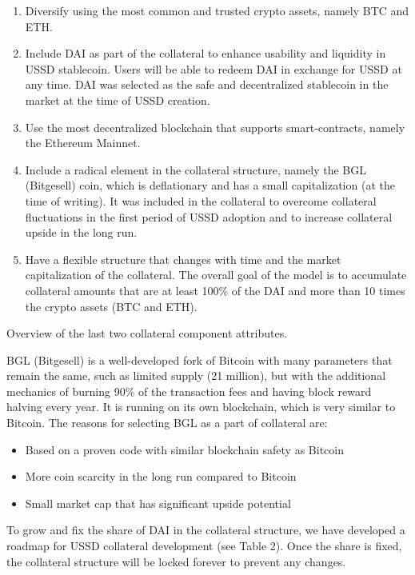 \begin{enumerate}
  \item Diversify using the most common and trusted crypto assets, namely BTC and ETH.
  \item Include DAI as part of the collateral to enhance usability and liquidity in USSD stablecoin. 
  Users will be able to redeem DAI in exchange for USSD at any time. DAI was selected as the safe 
  and decentralized stablecoin in the market at the time of USSD creation.
  \item Use the most decentralized blockchain that supports smart-contracts, namely the Ethereum Mainnet.
  \item Include a radical element in the collateral structure, namely the BGL (Bitgesell) coin, 
  which is deflationary and has a small capitalization (at the time of writing). It was included 
  in the collateral to overcome collateral fluctuations in the first period of USSD adoption and 
  to increase collateral upside in the long run.
  \item Have a flexible structure that changes with time and the market capitalization of the 
  collateral. The overall goal of the model is to accumulate collateral amounts that are at least 100\% 
  of the DAI and more than 10 times the crypto assets (BTC and ETH).
\end{enumerate}

Overview of the last two collateral component attributes.

BGL (Bitgesell) is a well-developed fork of Bitcoin with many parameters that 
remain the same, such as limited supply (21 million), but with the additional 
mechanics of burning 90\% of the transaction fees and having block reward halving 
every year. It is running on its own blockchain, which is very similar to Bitcoin. 
The reasons for selecting BGL as a part of collateral are:
\begin{itemize}
  \item Based on a proven code with similar blockchain safety as Bitcoin
  \item More coin scarcity in the long run compared to Bitcoin
  \item Small market cap that has significant upside potential
\end{itemize}
To grow and fix the share of DAI in the collateral structure, we have developed a roadmap 
for USSD collateral development (see Table 2). Once the share is fixed, the collateral structure 
will be locked forever to prevent any changes.



